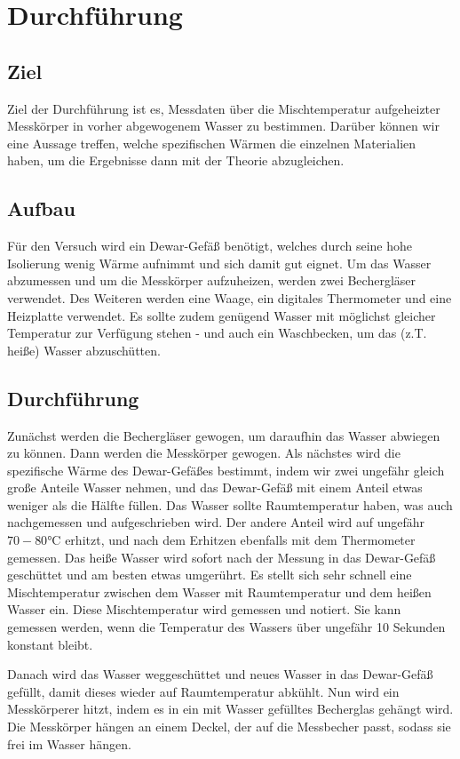 \section{Durchführung}
\label{sec:Durchführung}
\subsection{Ziel}
Ziel der Durchführung ist es, Messdaten über die Mischtemperatur aufgeheizter Messkörper in vorher abgewogenem Wasser zu bestimmen.
Darüber können wir eine Aussage treffen, welche spezifischen Wärmen die einzelnen Materialien haben, um die Ergebnisse dann mit der Theorie abzugleichen.

\subsection{Aufbau}
Für den Versuch wird ein Dewar-Gefäß benötigt, welches durch seine hohe Isolierung wenig Wärme aufnimmt und sich damit gut eignet. 
Um das Wasser abzumessen und um die Messkörper aufzuheizen, werden zwei Bechergläser verwendet.
Des Weiteren werden eine Waage, ein digitales Thermometer und eine Heizplatte verwendet.
Es sollte zudem genügend Wasser mit möglichst gleicher Temperatur zur Verfügung stehen - und auch ein Waschbecken, um das (z.T. heiße) Wasser abzuschütten.

\subsection{Durchführung}
Zunächst werden die Bechergläser gewogen, um daraufhin das Wasser abwiegen zu können. Dann werden die Messkörper gewogen.
Als nächstes wird die spezifische Wärme des Dewar-Gefäßes bestimmt, indem wir zwei ungefähr gleich große Anteile Wasser nehmen, und das Dewar-Gefäß
mit einem Anteil etwas weniger als die Hälfte füllen. Das Wasser sollte Raumtemperatur haben, was auch nachgemessen und aufgeschrieben wird.
Der andere Anteil wird auf ungefähr $70-80\si{\celsius}$ erhitzt, und nach dem Erhitzen ebenfalls mit dem Thermometer gemessen.
Das heiße Wasser wird sofort nach der Messung in das Dewar-Gefäß geschüttet und am besten etwas umgerührt.
Es stellt sich sehr schnell eine Mischtemperatur zwischen dem Wasser mit Raumtemperatur und dem heißen Wasser ein.
Diese Mischtemperatur wird gemessen und notiert. Sie kann gemessen werden, wenn die Temperatur des Wassers über ungefähr 10 Sekunden konstant bleibt.

Danach wird das Wasser weggeschüttet und neues Wasser in das Dewar-Gefäß gefüllt, damit dieses wieder auf Raumtemperatur abkühlt.
Nun wird ein Messkörperer hitzt, indem es in ein mit Wasser gefülltes Becherglas gehängt wird. Die Messkörper hängen an einem Deckel, der auf
die Messbecher passt, sodass sie frei im Wasser hängen.

